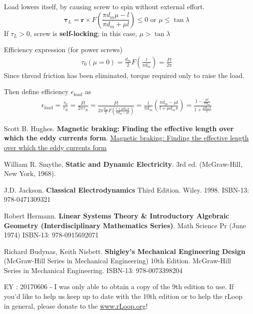 \documentclass[10pt]{amsart}
\begin{document}
\begin{multicols*}{2}
Load lowers itself, by causing screw to spin without external effort.  
\begin{equation}
	\mathbf{\tau}_L  = \mathbf{r} \times F \left( \frac{ \pi d_m \mu - l }{ \pi d_m + \mu l } \right)  \leq 0 \text{ or } \mu \leq \tan{\lambda} 
\end{equation}
If $\tau_L >0$, screw is \textbf{self-locking}; in this case, $\mu > \tan{\lambda}$

Efficiency expression (for power screws)
\begin{equation}
\begin{gathered}
	\tau_0(\mu = 0)  = \frac{d_m}{2} F\left( \frac{l }{ \pi d_m} \right)  = \frac{Fl}{2\pi }
\end{gathered}
\end{equation}
Since thread friction has been eliminated, torque required only to raise the load.  

Then define efficiency $\epsilon_{\text{load}}$ as 
\begin{equation}
\begin{gathered}
	\epsilon_{\text{load}} = \frac{ \tau_0 }{ \tau_R} = \frac{Fl}{2\pi \tau_R} = \frac{Fl}{ 2\pi  \frac{d_m}{2} F \left( \frac{ l + \mu d_m \pi }{ \pi d_m - \mu l } \right) } = \frac{l}{ \pi d_m} \left( \frac{ \pi d_m - \mu l }{ l + \mu d_m \pi } \right) = \frac{1 - \frac{ \mu l }{ \pi d_m } }{ 1 + \frac{ \mu d_m \pi }{ l }  } 
\end{gathered}
\end{equation}

\end{multicols*}

\begin{thebibliography}{9}


Scott B. Hughes.  \textbf{Magnetic braking: Finding the effective length over which the eddy currents form}.  
\href{https://drive.google.com/file/d/0Bwo3W0v5P04LX29XT2NFeVY0a1E/view}{Magnetic braking: Finding the effective length over which the eddy currents form}  


William R. Smythe, \textbf{Static and Dynamic Electricity}.  3rd ed. (McGraw-Hill, New York, 1968).  

J.D. Jackson.  \textbf{Classical Electrodynamics} Third Edition.  Wiley.  1998.   ISBN-13: 978-0471309321

Robert Hermann.  \textbf{Linear Systems Theory \& Introductory Algebraic Geometry (Interdisciplinary Mathematics Series)}.  Math Science Pr (June 1974)
ISBN-13: 978-0915692071

Richard Budynas, Keith Nisbett.  \textbf{Shigley's Mechanical Engineering Design} (McGraw-Hill Series in Mechanical Engineering) 10th Edition.  McGraw-Hill Series in Mechanical Engineering.  ISBN-13: 978-0073398204

EY : 20170606 -  I was only able to obtain a copy of the 9th edition to use.  If you'd like to help us keep up to date with the 10th edition or to help the rLoop in general, please donate to the \href{rLoop}{www.rLoop.org}!


\end{thebibliography}
\end{document}
